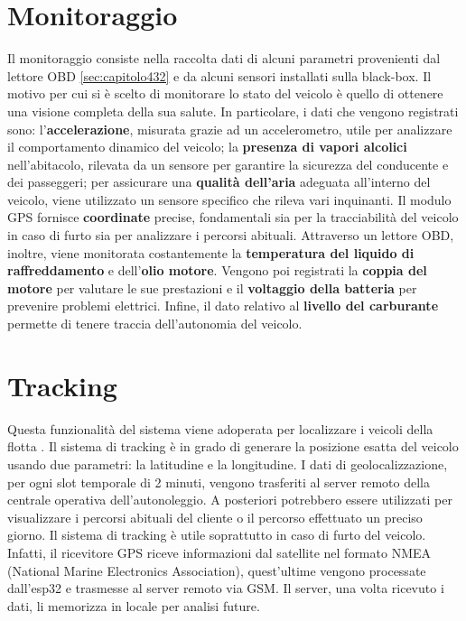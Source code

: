 \documentclass[12pt, a4paper, italian]{report}
\numberwithin{figure}{chapter}
\numberwithin{table}{chapter}
\begin{document}
\section{Monitoraggio}
Il monitoraggio consiste nella raccolta dati di alcuni parametri provenienti dal lettore OBD \ref{sec:capitolo432} %
e da alcuni sensori installati sulla black-box. 
Il motivo per cui si è scelto di monitorare lo stato del veicolo è quello di ottenere una visione completa della sua salute. In particolare, i dati che vengono registrati sono: l'\textbf{accelerazione}, misurata grazie ad un accelerometro, utile per analizzare il comportamento dinamico del veicolo; la \textbf{presenza di vapori alcolici} nell'abitacolo, rilevata da un sensore per garantire la sicurezza del conducente e dei passeggeri; per assicurare una \textbf{qualità dell'aria} adeguata all'interno del veicolo, viene utilizzato un sensore specifico che rileva vari inquinanti. Il modulo GPS fornisce \textbf{coordinate} precise, fondamentali sia per la tracciabilità del veicolo in caso di furto sia per analizzare i percorsi abituali. Attraverso un lettore OBD, inoltre, viene monitorata  costantemente la \textbf{temperatura del liquido di raffreddamento} e dell'\textbf{olio motore}. Vengono poi registrati la \textbf{coppia del motore} per valutare le sue prestazioni e il \textbf{voltaggio della batteria} per prevenire problemi elettrici.
Infine, il dato relativo al \textbf{livello del carburante} permette di tenere traccia dell'autonomia del veicolo. 
\section{Tracking}
Questa funzionalità del sistema viene adoperata per localizzare i veicoli della flotta \cite{al2012hybrid}. Il sistema di tracking è in grado di generare la posizione esatta del veicolo usando due parametri: la latitudine e la longitudine. I dati di geolocalizzazione, per ogni slot temporale di 2 minuti, vengono trasferiti al server remoto della centrale operativa dell'autonoleggio. A posteriori potrebbero essere utilizzati per visualizzare i percorsi abituali del cliente o il percorso effettuato un preciso giorno. Il sistema di tracking è utile soprattutto in caso di furto del veicolo.
Infatti, il ricevitore GPS riceve informazioni dal satellite nel formato NMEA (National Marine Electronics Association), quest'ultime vengono processate dall'esp32 e trasmesse al server remoto via GSM. Il server, una volta ricevuto i dati, li memorizza in locale per analisi future. 
\end{document}
